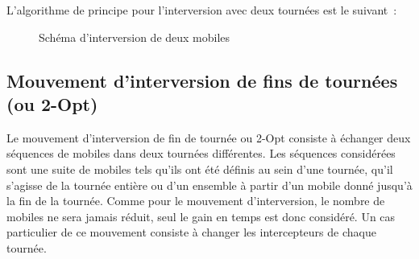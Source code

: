 			L'algorithme de principe pour l'interversion avec deux tournées est le suivant :
			\begin{code}
				\begin{algo}[informal]
					\BEGIN
									\ENDFORGEN
								\ENDFORGEN
							\ENDFORGEN
						\ENDFORGEN
					\END
				\end{algo}
			\end{code}


			\begin{figure}[h!]
			\begin{subfigure}[b]{.54\linewidth}
				\centering
				\begin{tikzpicture}[schema]
					
				\end{tikzpicture}
				\label{subfig:move_swap1route}
			\end{subfigure}
			\hfill
			\begin{subfigure}[b]{.45\linewidth}
				\centering
				\begin{tikzpicture}[schema]
					
				\end{tikzpicture}
				\label{subfig:move_swap2routes}
			\end{subfigure}
			\caption{Schéma d'interversion de deux mobiles}
			\label{fig:move_swap}
			\end{figure}

		\subsection{Mouvement d'interversion de fins de tournées (ou 2-Opt)}
			Le mouvement d'interversion de fin de tournée ou 2-Opt consiste à échanger deux séquences de mobiles dans deux tournées différentes. Les séquences considérées sont une suite de mobiles tels qu'ils ont été définis au sein d'une tournée, qu'il s'agisse de la tournée entière ou d'un ensemble à partir d'un mobile donné jusqu'à la fin de la tournée. Comme pour le mouvement d'interversion, le nombre de mobiles ne sera jamais réduit, seul le gain en temps est donc considéré. Un cas particulier de ce mouvement consiste à changer les intercepteurs de chaque tournée.

